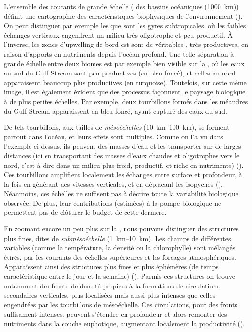 L'ensemble des courants de grande échelle ( des bassins océaniques \OM(\qty{1000}{\km})) définit une cartographie des caractéristiques biophysiques de l'environnement (\cite{omand_2013,omand_2015a}).
On peut distinguer par exemple les  que sont les gyres subtropicales, où les faibles échanges verticaux engendrent un milieu très oligotrophe et peu productif.
À l'inverse, les zones d'upwelling de bord est sont de véritables , très productives, en raison d'apports en nutriments depuis l'océan profond.
Une telle séparation à grande échelle entre deux biomes est par exemple bien visible sur la , où les eaux au sud du Gulf Stream sont peu productives (en bleu foncé), et celles au nord apparaissent beaucoup plus productives (en turquoise).
Toutefois, sur cette même image, il est également évident que des processus façonnent le paysage biologique à de plus petites échelles.
Par exemple, deux tourbillons formés dans les méandres du Gulf Stream apparaissent en bleu foncé, ayant capturé des eaux du sud.

De tels tourbillons, aux tailles de \emph{mésoéchelles} \OM(\qtyrange{10}{100}{\km}), se forment partout dans l'océan, et leurs effets sont multiples.
Comme on l'a vu dans l'exemple ci-dessus, ils peuvent  des masses d'eau et les transporter sur de larges distances (ici en transportant des masses d'eaux chaudes et oligotrophes vers le nord, c'est-à-dire dans un milieu plus froid, productif, et riche en nutriments) (\cite{lehahn_2011}).
Ces tourbillons amplifient localement les échanges entre surface et profondeur, à la fois en générant des vitesses verticales, et en déplacant les isopycnes (\cite{mcgillicuddy_1998}).
Néanmoins, ces échelles ne suffisent pas à décrire toute la variabilité biologique observée. De plus, leur contributions (estimées) à la pompe biologique ne permettent pas de clôturer le budget de cette dernière.

En zoomant encore un peu plus sur la , nous pouvons distinguer des structures plus fines, dites de \emph{submésoéchelle} \OM(\qtyrange{1}{10}{\km}).
Les champs de différentes variables (comme la température, la densité ou la chlorophylle) sont mélangés, étirés, par les courants des échelles supérieures et les forcages atmosphériques.
Apparaîssent ainsi des structures plus fines et plus éphémères (de temps caractéristique entre le jour et la semaine) (\cite{thomas_2008,mcwilliams_2016}).
Parmis ces structures on trouve notamment des fronts de densité propices à la formations de circulations secondaires verticales, plus localisées mais aussi plus intenses que celles engendrées par les tourbillons de mésoéchelle.
Ces circulations, pour des fronts suffisament intenses, peuvent s'étendre en profondeur et alors  remonter des nutriments dans la couche euphotique, augmentant localement la productivité (\cite{mahadevan_2016,levy_2018}).

